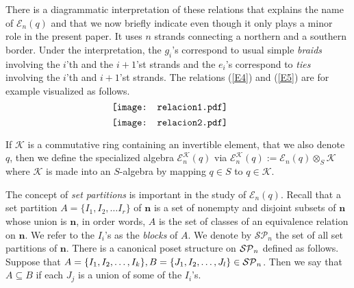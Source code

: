 \documentclass[10pt,a4,twoside,hidelinks,rm]{article}
\newcommand{\kk}{\mathcal{K}}
\newcommand{\E}{ {\mathcal E}_n(q)}
\theoremstyle{plain}
\begin{document}
There is a diagrammatic interpretation of these relations that explains the name of $ \E$
and that we now briefly indicate even though it only plays a minor role in the present paper.
It uses $n$ strands connecting a northern
and a southern border. Under the interpretation, the $ g_i$'s correspond 
to usual simple \textit{braids} involving the $i$'th and the $i+1$'st strand{\color{black}s} 
and the $ e_i$'s correspond to \textit{ties} involving the $ i$'th and $i+1$'st strands. 
The relations (\ref{E4}) and (\ref{E5}) are for example visualized as follows.
\begin{equation}\label{relacion1}
  \raisebox{-.5\height}{\texttt{[image: relacion1.pdf]}} \, \, \,\, \, \, \, \,\, \, 
\end{equation}
\begin{equation}\label{relacion2}
  \raisebox{-.5\height}{\texttt{[image: relacion2.pdf]}} \, \, \,\, \, \, \, \,\, \, 
\end{equation}


\medskip
If $ \kk $ is a commutative ring containing an invertible element, that we also denote $q  $,
then we define the specialized algebra ${ \mathcal E}^{\kk}_n(q) $
via ${ \mathcal E}^{\kk}_n(q)  := \E \otimes_S \kk $ 
where $ \kk $ is made into an $S$-algebra by mapping $
q \in S $ to $ q \in \kk $.






\medskip
The concept of \textit{set partitions} is important in the study of $ \E$.
Recall that a set partition $A=\{I_1,I_2,\ldots I_r\}$ of $\mathbf{n}$ is a set of 
nonempty and disjoint subsets 
of $\mathbf{n}$ 
whose union is $\mathbf{n}$, in order words, $ A $ is the set of classes of
an equivalence relation on $\mathbf{n}$.
We refer to the $ I_i$'s as
the \textit{blocks} of $A$. We denote by $\mathcal{SP}_n$ the set of all set partitions of
$\mathbf{n}$. 
There is a canonical poset structure on $
{\cal SP}_n$ defined as follows. Suppose that $A=\{I_1,I_2,\ldots,
I_k\},  B=\{J_1,I_2,\ldots, J_l \} \in {\cal
SP}_n$. Then we say that $ A \subseteq B $ if each $ J_j $ is a
union of some of the $ I_i$'s.
\end{document}
